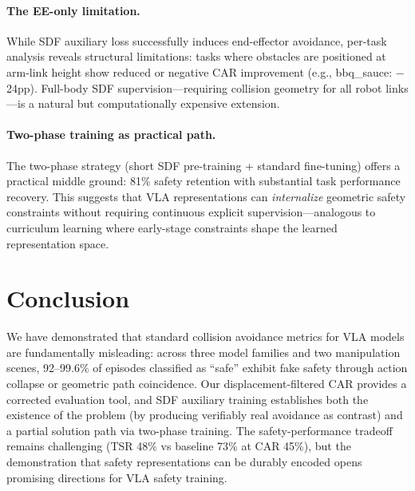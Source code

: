 \documentclass[letterpaper]{article}
\begin{document}
\paragraph{The EE-only limitation.}
While SDF auxiliary loss successfully induces end-effector avoidance, per-task analysis reveals structural limitations: tasks where obstacles are positioned at arm-link height show reduced or negative CAR improvement (e.g., bbq\_sauce: $-$24pp). Full-body SDF supervision---requiring collision geometry for all robot links---is a natural but computationally expensive extension.

\paragraph{Two-phase training as practical path.}
The two-phase strategy (short SDF pre-training + standard fine-tuning) offers a practical middle ground: 81\% safety retention with substantial task performance recovery. This suggests that VLA representations can \emph{internalize} geometric safety constraints without requiring continuous explicit supervision---analogous to curriculum learning where early-stage constraints shape the learned representation space.

\section{Conclusion}
\label{sec:conclusion}

We have demonstrated that standard collision avoidance metrics for VLA models are fundamentally misleading: across three model families and two manipulation scenes, 92--99.6\% of episodes classified as ``safe'' exhibit fake safety through action collapse or geometric path coincidence. Our displacement-filtered CAR provides a corrected evaluation tool, and SDF auxiliary training establishes both the existence of the problem (by producing verifiably real avoidance as contrast) and a partial solution path via two-phase training. The safety-performance tradeoff remains challenging (TSR 48\% vs baseline 73\% at CAR 45\%), but the demonstration that safety representations can be durably encoded opens promising directions for VLA safety training.
\end{document}
